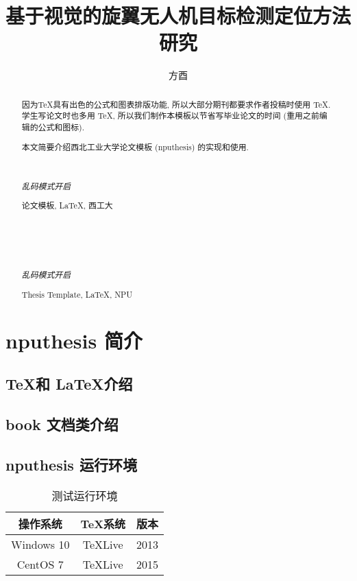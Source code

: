 \documentclass[twoside,UTF8]{nputhesis}
\title[Research on Vision-based Object Detection and Localization for Quadrotors]{基于视觉的旋翼无人机目标检测定位方法研究}
\author[You Fang]{方酉}
\begin{document}
\makecover  %
\frontmatter

\begin{abstract}  
    因为\TeX 具有出色的公式和图表排版功能, 所以大部分期刊都要求作者投稿时使用
    \TeX. 学生写论文时也多用 \TeX, 所以我们制作本模板以节省写毕业论文的时间 
    (重用之前编辑的公式和图标).

    本文简要介绍西北工业大学论文模板 (nputhesis) 的实现和使用.

    { %
        \noindent\hrulefill\\
        {\centerline {\it 乱码模式开启}}
        \noindent\hrulefill
    }
    \begin{keywords}
        论文模板, \LaTeX, 西工大 
    \end{keywords}
\end{abstract}

\begin{Abstract}

    { %
        \noindent\hrulefill\\
        {\centerline {\it 乱码模式开启}}
        \noindent\hrulefill
    }
    \begin{Keywords}
        Thesis Template, \LaTeX, NPU
    \end{Keywords}
\end{Abstract}

\tableofcontents 

\mainmatter  %
\chapter{nputhesis 简介}
\section{\TeX 和 \LaTeX 介绍}
\section{book 文档类介绍}
\section{nputhesis 运行环境}

\begin{table}[h]
    \caption{测试运行环境}
    \centering
    \begin{tabular}{ccc}
        \toprule
        操作系统    & \TeX 系统   & 版本 \\
        \midrule
        Windows 10  & TeXLive     & 2013 \\
        CentOS 7    & TeXLive     & 2015 \\
        \bottomrule
    \end{tabular}
\end{table}
\end{document}

